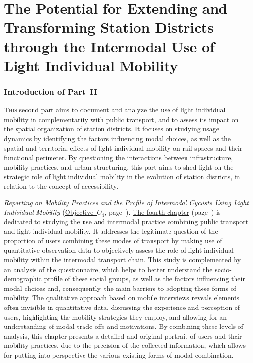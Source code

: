 \part{The Potential for Extending and Transforming Station Districts through the Intermodal Use of Light Individual Mobility
    \label{part2:titre}
    }

\cleardoublepage
\section*{Introduction of Part~II
    \label{part2:introduction}
    }

\lettrine[lines=3, findent=8pt, nindent=0pt]{ T}{his} second part aims to document and analyze the use of light individual mobility in complementarity with public transport, and to assess its impact on the spatial organization of station districts. It focuses on studying usage dynamics by identifying the factors influencing modal choices, as well as the spatial and territorial effects of light individual mobility on rail spaces and their functional perimeter. By questioning the interactions between infrastructure, mobility practices, and urban structuring, this part aims to shed light on the strategic role of light individual mobility in the evolution of station districts, in relation to the concept of accessibility.%

\textsl{Reporting on Mobility Practices and the Profile of Intermodal Cyclists Using Light Individual Mobility} (\hyperref[objectif-4]{Objective~\(O_4\)}, page~\pageref{objectif-4}). \hyperref[chap4:titre]{The fourth chapter} (page~\pageref{chap4:titre}) is dedicated to studying the use and intermodal practice combining public transport and light individual mobility. It addresses the legitimate question of the proportion of users combining these modes of transport by making use of quantitative observation data to objectively assess the role of light individual mobility within the intermodal transport chain. This study is complemented by an analysis of the questionnaire, which helps to better understand the socio-demographic profile of these social groups, as well as the factors influencing their modal choices and, consequently, the main barriers to adopting these forms of mobility. The qualitative approach based on mobile interviews reveals elements often invisible in quantitative data, discussing the experience and perception of users, highlighting the mobility strategies they employ, and allowing for an understanding of modal trade-offs and motivations. By combining these levels of analysis, this chapter presents a detailed and original portrait of users and their mobility practices, due to the precision of the collected information, which allows for putting into perspective the various existing forms of modal combination.%

